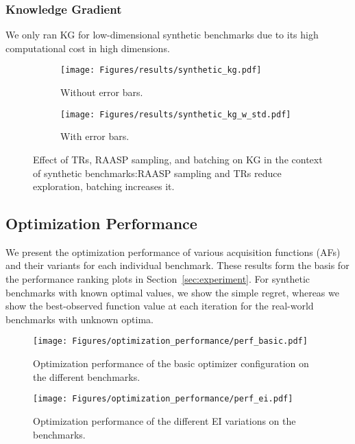 \documentclass[accepted]{uai2025}
\begin{document}
\subsubsection{Knowledge Gradient}

We only ran \ac{KG} for low-dimensional synthetic benchmarks due to its high computational cost in high dimensions.

\begin{figure}[H]
    \centering
    \begin{subfigure}{0.48\linewidth}
    \texttt{[image: Figures/results/synthetic\_kg.pdf]}
    \caption{Without error bars.}
    \end{subfigure}
    \begin{subfigure}{0.48\linewidth}
    \texttt{[image: Figures/results/synthetic\_kg\_w\_std.pdf]}
    \caption{With error bars.}
    \end{subfigure}
    \caption{Effect of \acp{TR}, \ac{RAASP} sampling, and batching on \ac{KG} in the context of synthetic benchmarks:\ac{RAASP} sampling and \acp{TR} reduce exploration, batching increases it. }
\end{figure}

\subsection{Optimization Performance}
\label{app:raw-optimization-performance}

We present the optimization performance of various acquisition functions (\acp{AF}) and their variants for each individual benchmark. These results form the basis for the performance ranking plots in Section~\ref{sec:experiment}.
For synthetic benchmarks with known optimal values, we show the simple regret, whereas we show the best-observed function value at each iteration for the real-world benchmarks with unknown optima.


\newpage
\null
\vfill

\begin{figure}[H]
    \centering
    \texttt{[image: Figures/optimization\_performance/perf\_basic.pdf]}
    \caption{Optimization performance of the basic optimizer configuration on the different benchmarks.}
\end{figure}

\vfill

\newpage
\null
\vfill

\begin{figure}[H]
    \centering
    \texttt{[image: Figures/optimization\_performance/perf\_ei.pdf]}
    \caption{Optimization performance of the different EI variations on the benchmarks.}
\end{figure}
\end{document}
